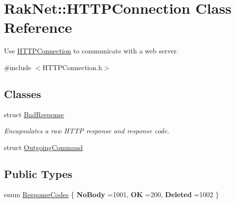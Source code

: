 \hypertarget{class_rak_net_1_1_h_t_t_p_connection}{\section{Rak\-Net\-:\-:H\-T\-T\-P\-Connection Class Reference}
\label{class_rak_net_1_1_h_t_t_p_connection}
}


Use \hyperlink{class_rak_net_1_1_h_t_t_p_connection}{H\-T\-T\-P\-Connection} to communicate with a web server.  




{\ttfamily \#include $<$H\-T\-T\-P\-Connection.\-h$>$}

\subsection*{Classes}
\begin{DoxyCompactItemize}
\item 
struct \hyperlink{struct_rak_net_1_1_h_t_t_p_connection_1_1_bad_response}{Bad\-Response}
\begin{DoxyCompactList}\small\item\em Encapsulates a raw H\-T\-T\-P response and response code. \end{DoxyCompactList}\item 
struct \hyperlink{struct_rak_net_1_1_h_t_t_p_connection_1_1_outgoing_command}{Outgoing\-Command}
\end{DoxyCompactItemize}
\subsection*{Public Types}
\begin{DoxyCompactItemize}
\item 
enum \hyperlink{class_rak_net_1_1_h_t_t_p_connection_a476dfc8417c5ba51f29bcebf24f1685e}{Response\-Codes} \{ {\bfseries No\-Body} =1001, 
{\bfseries O\-K} =200, 
{\bfseries Deleted} =1002
 \}
\end{DoxyCompactItemize}
